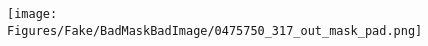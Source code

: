 \documentclass[runningheads]{llncs}
\begin{document}
\begin{figure}[tb]
\texttt{[image: Figures/Fake/BadMaskBadImage/0475750\_317\_out\_mask\_pad.png]} \\ [-0.5ex]%
\end{figure}
\end{document}
